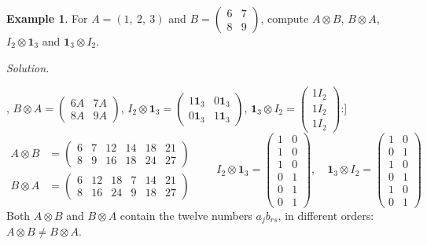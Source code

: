 \documentclass[12pt]{article}
\newcommand{\one}{\mathbf 1}
\theoremstyle{definition}
\newtheorem{example}[theorem]{Example}
\begin{document}
\begin{example}\label{b16.2}
For \(A=(1,\ 2,\ 3)\) and \(B=\begin{pmatrix}6&7\\8&9\end{pmatrix}\), compute \(A\otimes B\), \(B\otimes A\),
\(I_2\otimes\one_3\) and \(\one_3\otimes I_2\).
\end{example}
\textit{Solution.}
\begin{board}[Definition~\ref{b16.1}, block by block: \(A\otimes B=[1B\ \ 2B\ \ 3B]\),
\(B\otimes A=\left(\begin{smallmatrix}6A&7A\\8A&9A\end{smallmatrix}\right)\),
\(I_2\otimes\one_3=\left(\begin{smallmatrix}1\one_3&0\one_3\\0\one_3&1\one_3\end{smallmatrix}\right)\),
\(\one_3\otimes I_2=\left(\begin{smallmatrix}1I_2\\1I_2\\1I_2\end{smallmatrix}\right)\):]
\[
\begin{aligned}
A\otimes B&=\begin{pmatrix}6&7&12&14&18&21\\8&9&16&18&24&27\end{pmatrix}\\[4pt]
B\otimes A&=\begin{pmatrix}6&12&18&7&14&21\\8&16&24&9&18&27\end{pmatrix}
\end{aligned}\qquad
I_2\otimes\one_3=\begin{pmatrix}1&0\\1&0\\1&0\\0&1\\0&1\\0&1\end{pmatrix},\quad
\one_3\otimes I_2=\begin{pmatrix}1&0\\0&1\\1&0\\0&1\\1&0\\0&1\end{pmatrix}
\]
Both \(A\otimes B\) and \(B\otimes A\) contain the twelve numbers \(a_jb_{rs}\), in different orders:
\(A\otimes B\ne B\otimes A\).
\end{board}
\end{document}
